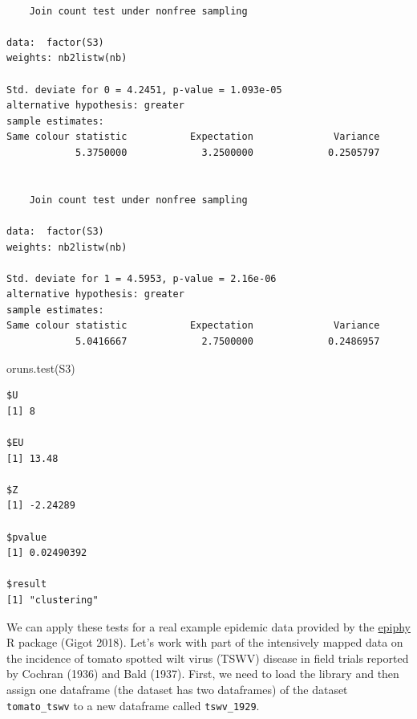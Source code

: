 \documentclass[
  letterpaper,
]{book}
\newenvironment{Shaded}{\begin{snugshade}}{\end{snugshade}}
\newcommand{\DecValTok}[1]{\textcolor[rgb]{0.68,0.00,0.00}{#1}}
\newcommand{\FunctionTok}[1]{\textcolor[rgb]{0.28,0.35,0.67}{#1}}
\newcommand{\NormalTok}[1]{\textcolor[rgb]{0.00,0.23,0.31}{#1}}
\newcommand{\OtherTok}[1]{\textcolor[rgb]{0.00,0.23,0.31}{#1}}
\newcommand{\SpecialCharTok}[1]{\textcolor[rgb]{0.37,0.37,0.37}{#1}}
\begin{document}
\begin{verbatim}

    Join count test under nonfree sampling

data:  factor(S3) 
weights: nb2listw(nb) 

Std. deviate for 0 = 4.2451, p-value = 1.093e-05
alternative hypothesis: greater
sample estimates:
Same colour statistic           Expectation              Variance 
            5.3750000             3.2500000             0.2505797 


    Join count test under nonfree sampling

data:  factor(S3) 
weights: nb2listw(nb) 

Std. deviate for 1 = 4.5953, p-value = 2.16e-06
alternative hypothesis: greater
sample estimates:
Same colour statistic           Expectation              Variance 
            5.0416667             2.7500000             0.2486957 
\end{verbatim}

\begin{Shaded}
\begin{Highlighting}[]
\FunctionTok{oruns.test}\NormalTok{(S3)}
\end{Highlighting}
\end{Shaded}

\begin{verbatim}
$U
[1] 8

$EU
[1] 13.48

$Z
[1] -2.24289

$pvalue
[1] 0.02490392

$result
[1] "clustering"
\end{verbatim}

We can apply these tests for a real example epidemic data provided by
the \href{https://chgigot.github.io/epiphy/}{epiphy} R package (Gigot
2018). Let's work with part of the intensively mapped data on the
incidence of tomato spotted wilt virus (TSWV) disease in field trials
reported by Cochran (1936) and Bald (1937). First, we need to load the
library and then assign one dataframe (the dataset has two dataframes)
of the dataset \texttt{tomato\_tswv} to a new dataframe called
\texttt{tswv\_1929}.

\begin{Shaded}
\end{Shaded}
\end{document}
